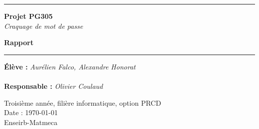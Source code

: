 \thispagestyle{empty}


%
\hrule
\begin{flushleft}
\Huge{\textbf{Projet PG305}}\\
\textit{Craquage de mot de passe}
\end{flushleft}
\begin{flushright}
\huge\textbf{Rapport}\\
\end{flushright}
\hrule

\vspace{80pt}
\noindent\textbf{Élève :}
\emph{Aurélien Falco, Alexandre Honorat}\\
\\
\noindent\textbf{Responsable :}
\emph{Olivier Coulaud}\\


\vspace{60pt}
\normalsize
\begin{center}
  Troisième année, filière informatique, option PRCD\\
  Date : \today\\
  Enseirb-Matmeca
\end{center}
\vspace{50pt}
